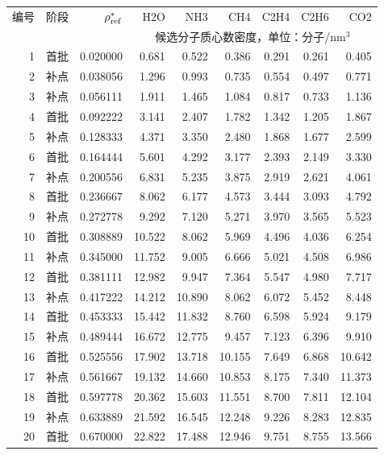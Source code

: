 \documentclass[a4paper]{ctexart}
\begin{document}
\begin{center}\small\setlength{\tabcolsep}{4pt}
\begin{tabular}{rrr|rrrrrr}\toprule
编号 & 阶段 & $\rho^*_{\rm ref}$ & H2O & NH3 & CH4 & C2H4 & C2H6 & CO2\\
 & & & \multicolumn{6}{c}{候选分子质心数密度，单位：分子/nm$^3$}\\\midrule
1 & 首批 & 0.020000 & 0.681 & 0.522 & 0.386 & 0.291 & 0.261 & 0.405 \\
2 & 补点 & 0.038056 & 1.296 & 0.993 & 0.735 & 0.554 & 0.497 & 0.771 \\
3 & 补点 & 0.056111 & 1.911 & 1.465 & 1.084 & 0.817 & 0.733 & 1.136 \\
4 & 首批 & 0.092222 & 3.141 & 2.407 & 1.782 & 1.342 & 1.205 & 1.867 \\
5 & 补点 & 0.128333 & 4.371 & 3.350 & 2.480 & 1.868 & 1.677 & 2.599 \\
6 & 首批 & 0.164444 & 5.601 & 4.292 & 3.177 & 2.393 & 2.149 & 3.330 \\
7 & 补点 & 0.200556 & 6.831 & 5.235 & 3.875 & 2.919 & 2.621 & 4.061 \\
8 & 首批 & 0.236667 & 8.062 & 6.177 & 4.573 & 3.444 & 3.093 & 4.792 \\
9 & 补点 & 0.272778 & 9.292 & 7.120 & 5.271 & 3.970 & 3.565 & 5.523 \\
10 & 首批 & 0.308889 & 10.522 & 8.062 & 5.969 & 4.496 & 4.036 & 6.254 \\
11 & 补点 & 0.345000 & 11.752 & 9.005 & 6.666 & 5.021 & 4.508 & 6.986 \\
12 & 首批 & 0.381111 & 12.982 & 9.947 & 7.364 & 5.547 & 4.980 & 7.717 \\
13 & 补点 & 0.417222 & 14.212 & 10.890 & 8.062 & 6.072 & 5.452 & 8.448 \\
14 & 首批 & 0.453333 & 15.442 & 11.832 & 8.760 & 6.598 & 5.924 & 9.179 \\
15 & 补点 & 0.489444 & 16.672 & 12.775 & 9.457 & 7.123 & 6.396 & 9.910 \\
16 & 首批 & 0.525556 & 17.902 & 13.718 & 10.155 & 7.649 & 6.868 & 10.642 \\
17 & 补点 & 0.561667 & 19.132 & 14.660 & 10.853 & 8.175 & 7.340 & 11.373 \\
18 & 首批 & 0.597778 & 20.362 & 15.603 & 11.551 & 8.700 & 7.811 & 12.104 \\
19 & 补点 & 0.633889 & 21.592 & 16.545 & 12.248 & 9.226 & 8.283 & 12.835 \\
20 & 首批 & 0.670000 & 22.822 & 17.488 & 12.946 & 9.751 & 8.755 & 13.566 \\
\bottomrule\end{tabular}\end{center}
\end{document}
